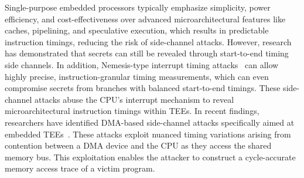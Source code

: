 Single-purpose embedded processors typically emphasize simplicity, power
efficiency, and cost-effectiveness over advanced microarchitectural
features like caches, pipelining, and speculative execution, which 
results in predictable instruction timings, reducing the risk of
side-channel attacks. However, research~\cite{Travis, brumley2005remote}
has demonstrated that secrets can still be revealed through start-to-end
timing side channels.
In addition, Nemesis-type interrupt timing attacks~\cite{Nemesis} can
allow highly precise, instruction-granular timing measurements, which
can even compromise secrets from branches with balanced start-to-end
timings. These side-channel attacks abuse the CPU's interrupt mechanism to
reveal microarchitectural instruction timings within \acp{TEE}.
In recent findings, researchers have identified DMA-based side-channel
attacks specifically aimed at embedded TEEs~\cite{busted, marton}. These
attacks exploit nuanced timing variations arising from contention between a
DMA device and the CPU as they access the shared memory bus. This
exploitation enables the attacker to construct a cycle-accurate memory
access trace of a victim program.

